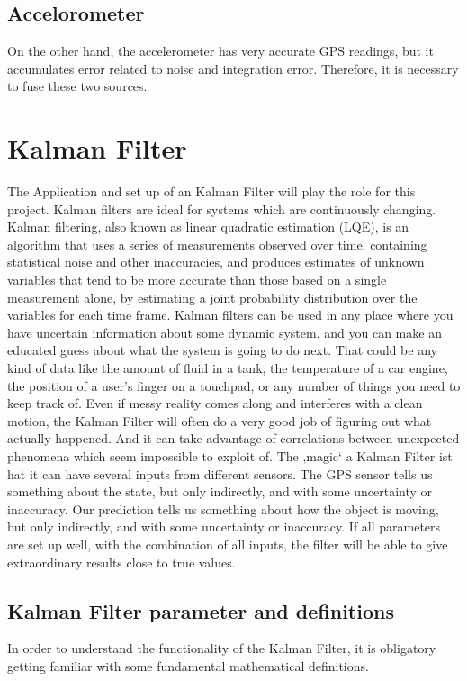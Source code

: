 \subsection{Accelorometer}
On the other hand, the accelerometer has very accurate GPS readings, but it accumulates error related to noise and integration error. Therefore, it is necessary to fuse these two sources. \cite{1-github-mad}

\section{Kalman Filter}
The Application and set up of an Kalman Filter will play the role for this project. Kalman filters are ideal for systems which are continuously changing. Kalman filtering, also known as linear quadratic estimation (LQE), is an algorithm that uses a series of measurements observed over time, containing statistical noise and other inaccuracies, and produces estimates of unknown variables that tend to be more accurate than those based on a single measurement alone, by estimating a joint probability distribution over the variables for each time frame. \cite{1-github-mad} 
Kalman filters can be used in any place where you have uncertain information about some dynamic system, and you can make an educated guess about what the system is going to do next. That could be any kind of data like the amount of fluid in a tank, the temperature of a car engine, the position of a user’s finger on a touchpad, or any number of things you need to keep track of. Even if messy reality comes along and interferes with a clean motion, the Kalman Filter will often do a very good job of figuring out what actually happened. And it can take advantage of correlations between unexpected phenomena which seem impossible to exploit of.
 The ‚magic‘  a Kalman Filter ist hat it can have several inputs from different sensors. The GPS sensor tells us something about the state, but only indirectly, and with some uncertainty or inaccuracy. Our prediction tells us something about how the object is moving, but only indirectly, and with some uncertainty or inaccuracy. If all parameters are set up well, with the combination of all inputs, the filter will be able to give extraordinary results close to true values. 



\subsection{Kalman Filter parameter and definitions}
In order to understand the functionality of the Kalman Filter, it is obligatory getting familiar with some fundamental mathematical definitions.


